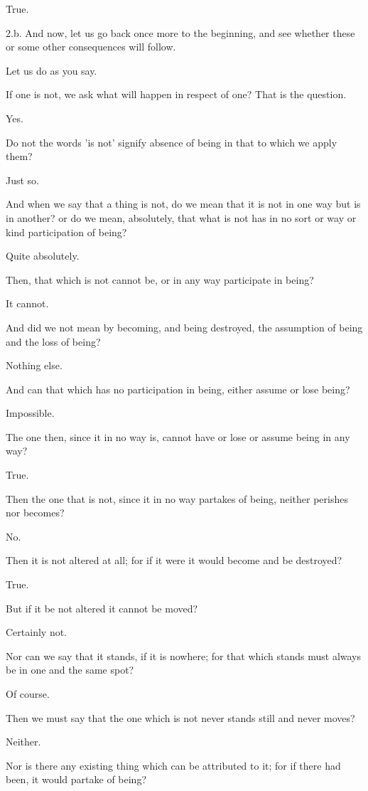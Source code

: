True.

2.b. And now, let us go back once more to the beginning, and see whether
these or some other consequences will follow.

Let us do as you say.

If one is not, we ask what will happen in respect of one? That is the
question.

Yes.

Do not the words 'is not' signify absence of being in that to which we
apply them?

Just so.

And when we say that a thing is not, do we mean that it is not in one
way but is in another? or do we mean, absolutely, that what is not has
in no sort or way or kind participation of being?

Quite absolutely.

Then, that which is not cannot be, or in any way participate in being?

It cannot.

And did we not mean by becoming, and being destroyed, the assumption of
being and the loss of being?

Nothing else.

And can that which has no participation in being, either assume or lose
being?

Impossible.

The one then, since it in no way is, cannot have or lose or assume being
in any way?

True.

Then the one that is not, since it in no way partakes of being, neither
perishes nor becomes?

No.

Then it is not altered at all; for if it were it would become and be
destroyed?

True.

But if it be not altered it cannot be moved?

Certainly not.

Nor can we say that it stands, if it is nowhere; for that which stands
must always be in one and the same spot?

Of course.

Then we must say that the one which is not never stands still and never
moves?

Neither.

Nor is there any existing thing which can be attributed to it; for if
there had been, it would partake of being?

